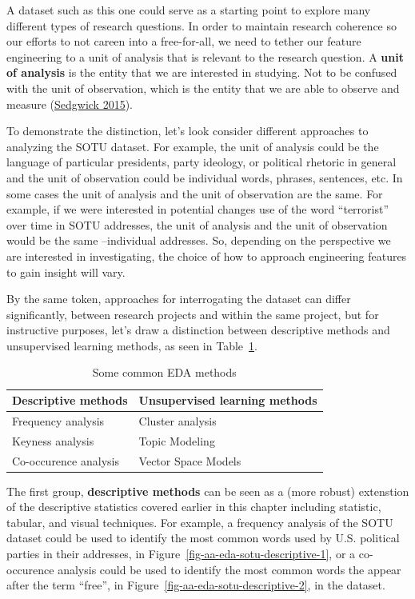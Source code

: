 \documentclass[
  letterpaper,
  DIV=11,
  numbers=noendperiod]{scrreport}
\theoremstyle{definition}
\theoremstyle{remark}
\begin{document}
A dataset such as this one could serve as a starting point to explore
many different types of research questions. In order to maintain
research coherence so our efforts to not careen into a free-for-all, we
need to tether our feature engineering to a unit of analysis that is
relevant to the research question. A \textbf{unit of analysis} is the
entity that we are interested in studying. Not to be confused with the
unit of observation, which is the entity that we are able to observe and
measure (\protect\hyperlink{ref-Sedgwick2015}{Sedgwick 2015}).

To demonstrate the distinction, let's look consider different approaches
to analyzing the SOTU dataset. For example, the unit of analysis could
be the language of particular presidents, party ideology, or political
rhetoric in general and the unit of observation could be individual
words, phrases, sentences, etc. In some cases the unit of analysis and
the unit of observation are the same. For example, if we were interested
in potential changes use of the word ``terrorist'' over time in SOTU
addresses, the unit of analysis and the unit of observation would be the
same --individual addresses. So, depending on the perspective we are
interested in investigating, the choice of how to approach engineering
features to gain insight will vary.

By the same token, approaches for interrogating the dataset can differ
significantly, between research projects and within the same project,
but for instructive purposes, let's draw a distinction between
descriptive methods and unsupervised learning methods, as seen in
Table~\ref{tbl-eda-methods}.

\hypertarget{tbl-eda-methods}{}
\begin{table}
\caption{\label{tbl-eda-methods}Some common EDA methods }\tabularnewline

\centering
\begin{tabular}{l|l}
\hline
Descriptive methods & Unsupervised learning methods\\
\hline
Frequency analysis & Cluster analysis\\
\hline
Keyness analysis & Topic Modeling\\
\hline
Co-occurence analysis & Vector Space Models\\
\hline
\end{tabular}
\end{table}

The first group, \textbf{descriptive methods} can be seen as a (more
robust) extenstion of the descriptive statistics covered earlier in this
chapter including statistic, tabular, and visual techniques. For
example, a frequency analysis of the SOTU dataset could be used to
identify the most common words used by U.S. political parties in their
addresses, in Figure~\ref{fig-aa-eda-sotu-descriptive-1}, or a
co-occurence analysis could be used to identify the most common words
the appear after the term ``free'', in
Figure~\ref{fig-aa-eda-sotu-descriptive-2}, in the dataset.
\end{document}
